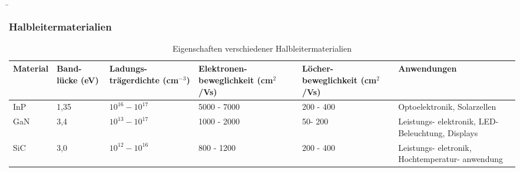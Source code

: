 \begin{frame}
    \b{
        \frametitle{Halbleitermaterialien}
        \begin{table}[H]
            \centering 
            \begin{tabular}{|p{1.7cm}|p{1.2cm}|p{2cm}|p{2.2cm}|p{2.2cm}|p{2.3cm}|}
                \hline
                \textbf{Material} & \textbf{Band- \newline lücke \newline (eV)} & \textbf{Ladungs- \newline trägerdichte \newline (cm$^{-3}$)} & \textbf{Elektronen- \newline beweglichkeit \newline (cm$^2$/Vs)} & \textbf{Löcher- \newline beweglichkeit \newline (cm$^2$/Vs)} & \textbf{Anwendungen}\\
                \hline
                InP & 1,35 & $10^{16} - 10^{17}$ & 5000 - 7000 & 200 - 400 & Optoelektronik, \newline Solarzellen \\
                \hline 
                GaN & 3,4 & $10^{13} - 10^{17}$ & 1000 - 2000 & 50- 200 & Leistungs- \newline elektronik, LED-Beleuchtung, Displays \\
                \hline
                SiC & 3,0 & $10^{12} - 10^{16}$ & 800 - 1200 & 200 - 400 & Leistungs- \newline eletronik, \newline Hochtemperatur- \newline anwendung \\ 
                \hline
                \end{tabular}
                \caption{Eigenschaften verschiedener Halbleitermaterialien}
        \end{table}
    }

\end{frame}

